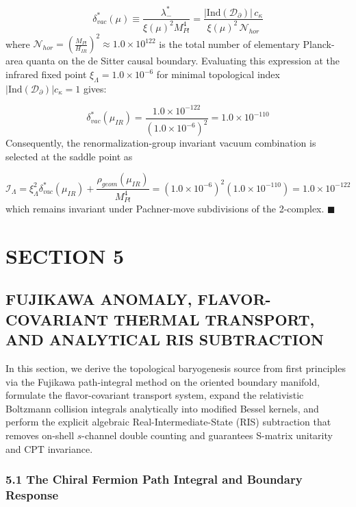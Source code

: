\documentclass[aps,prd,onecolumn,superscriptaddress,nofootinbib,longbibliography,10pt]{revtex4-2}
\begin{document}
{{  \[ \delta_{vac}^*(\mu) \equiv \frac{\lambda_-^*}{\xi(\mu)^2 M_{Pl}^4} = \frac{|\text{Ind}(\mathcal{D}_\partial)|\,c_\kappa}{\xi(\mu)^2\,\mathcal{N}_{hor}} \]
  where \(\mathcal{N}_{hor} = \left(\frac{M_{Pl}}{H_{IR}}\right)^2 \approx 1.0 \times 10^{122}\) is the total number of elementary Planck-area quanta on the de Sitter causal boundary. Evaluating this expression at the infrared fixed point \(\xi_\Lambda = 1.0 \times 10^{-6}\) for minimal topological index \(|\text{Ind}(\mathcal{D}_\partial)|c_\kappa = 1\) gives:


  \[ \delta_{vac}^*(\mu_{IR}) = \frac{1.0 \times {10^{-122}}}{(1.0 \times 10^{-6})^2} = 1.0 \times 10^{-110} \]
  Consequently, the renormalization-group invariant vacuum combination is selected at the saddle point as


  \[ \mathcal{I}_\Lambda = \xi_\Lambda^2 \delta_{vac}^*(\mu_{IR}) + \frac{\rho_{geom}(\mu_{IR})}{M_{Pl}^4} = (1.0 \times 10^{-6})^2(1.0 \times 10^{-110}) = 1.0 \times {10^{-122}} \]
  which remains invariant under Pachner-move subdivisions of the 2-complex. \(\blacksquare\)




 

  
\section*{SECTION 5}

  
\subsection*{FUJIKAWA ANOMALY, FLAVOR-COVARIANT THERMAL TRANSPORT, AND ANALYTICAL RIS SUBTRACTION}

  In this section, we derive the topological baryogenesis source from first principles via the Fujikawa path-integral method on the oriented boundary manifold, formulate the flavor-covariant transport system, expand the relativistic Boltzmann collision integrals analytically into modified Bessel kernels, and perform the explicit algebraic Real-Intermediate-State (RIS) subtraction that removes on-shell \(s\)-channel double counting and guarantees S-matrix unitarity and CPT invariance.


  
  
\subsubsection*{5.1 The Chiral Fermion Path Integral and Boundary Response}

}}
\end{document}
